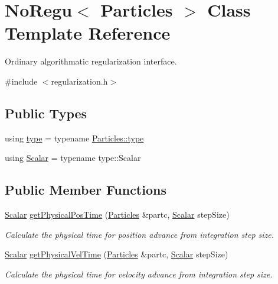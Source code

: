 \hypertarget{class_no_regu}{}\section{No\+Regu$<$ Particles $>$ Class Template Reference}
\label{class_no_regu}


Ordinary algorithmatic regularization interface.  




{\ttfamily \#include $<$regularization.\+h$>$}

\subsection*{Public Types}
\begin{DoxyCompactItemize}
\item 
using \mbox{\hyperlink{class_no_regu_acdfb043f122617376d117cadd040e220}{type}} = typename \mbox{\hyperlink{class_vel_indep_particles_a0c62b43c2f0a50565e5e06587fddee18}{Particles\+::type}}
\item 
using \mbox{\hyperlink{class_no_regu_af6597c7ec828f8630895903da9251be4}{Scalar}} = typename type\+::\+Scalar
\end{DoxyCompactItemize}
\subsection*{Public Member Functions}
\begin{DoxyCompactItemize}
\item 
\mbox{\hyperlink{class_no_regu_af6597c7ec828f8630895903da9251be4}{Scalar}} \mbox{\hyperlink{class_no_regu_aeae8b6811fa8b50e0d8cdbd2ae9a0d9c}{get\+Physical\+Pos\+Time}} (\mbox{\hyperlink{struct_particles}{Particles}} \&partc, \mbox{\hyperlink{class_no_regu_af6597c7ec828f8630895903da9251be4}{Scalar}} step\+Size)
\begin{DoxyCompactList}\small\item\em Calculate the physical time for position advance from integration step size. \end{DoxyCompactList}\item 
\mbox{\hyperlink{class_no_regu_af6597c7ec828f8630895903da9251be4}{Scalar}} \mbox{\hyperlink{class_no_regu_aef38cba8fa164bf3dfda2518f770d286}{get\+Physical\+Vel\+Time}} (\mbox{\hyperlink{struct_particles}{Particles}} \&partc, \mbox{\hyperlink{class_no_regu_af6597c7ec828f8630895903da9251be4}{Scalar}} step\+Size)
\begin{DoxyCompactList}\small\item\em Calculate the physical time for velocity advance from integration step size. \end{DoxyCompactList}\end{DoxyCompactItemize}


